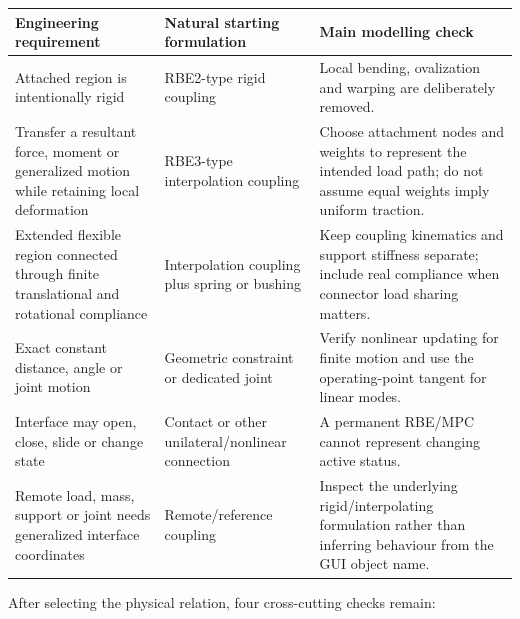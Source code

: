 \begin{center}
\footnotesize
\begin{tabular}{|>{\raggedright\arraybackslash}p{}|>{\raggedright\arraybackslash}p{}|>{\raggedright\arraybackslash}p{}|}
\hline
\textbf{Engineering requirement} & \textbf{Natural starting formulation} & \textbf{Main modelling check} \\
\hline
Attached region is intentionally rigid & RBE2-type rigid coupling & Local bending, ovalization and warping are deliberately removed. \\
\hline
Transfer a resultant force, moment or generalized motion while retaining local deformation & RBE3-type interpolation coupling & Choose attachment nodes and weights to represent the intended load path; do not assume equal weights imply uniform traction. \\
\hline
Extended flexible region connected through finite translational and rotational compliance & Interpolation coupling plus spring or bushing & Keep coupling kinematics and support stiffness separate; include real compliance when connector load sharing matters. \\
\hline
Exact constant distance, angle or joint motion & Geometric constraint or dedicated joint & Verify nonlinear updating for finite motion and use the operating-point tangent for linear modes. \\
\hline
Interface may open, close, slide or change state & Contact or other unilateral/nonlinear connection & A permanent RBE/MPC cannot represent changing active status. \\
\hline
Remote load, mass, support or joint needs generalized interface coordinates & Remote/reference coupling & Inspect the underlying rigid/interpolating formulation rather than inferring behaviour from the GUI object name. \\
\hline
\end{tabular}
\label{tab:coupling-decision-guide}
\end{center}

After selecting the physical relation, four cross-cutting checks remain:

